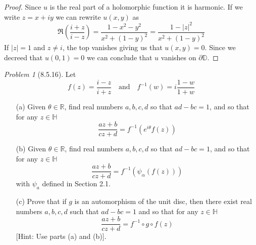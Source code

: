 \documentclass[10pt]{article}
\newcommand{\sk}{\vskip 10mm}
\newcommand{\bb}[1]{\mathbb{#1}}
\theoremstyle{remark}
\newtheorem{problem}{Problem}
\theoremstyle{remark}
\begin{document}
\begin{proof}
  Since $u$ is the real part of a holomorphic function it is harmonic. If
  we write $z=x+iy$ we can rewrite $u(x,y)$ as
  \[
    \Re(\frac{i+z}{i-z})=\frac{1-x^2-y^2}{x^2+(1-y)^2}=\frac{1-|z|^2}{x^2+(1-y)^2}
  \]
  If $|z|=1$ and $z\neq i$, the top vanishes giving us that $u(x,y)=0$.
  Since we decreed that $u(0,1)=0$ we can conclude that $u$ vanishes
  on $\partial\bb{D}$.
\end{proof}

\sk

\begin{problem}[8.5.16]
  Let
  \[
    f(z)=\frac{i-z}{i+z}\quad\text{and}\quad f^{-1}(w)=i\frac{1-w}{1+w}
  \]
  \begin{enumerate}
  \item[(a)] Given $\theta\in\bb{R}$, find real numbers $a,b,c,d$ so that
    $ad-bc=1$, and so that for any $z\in\bb{H}$
    \[
      \frac{az+b}{cz+d}=f^{-1}(e^{i\theta}f(z))
    \]
  \item[(b)] Given $\theta\in\bb{R}$, find real numbers $a,b,c,d$ so that
    $ad-bc=1$, and so that for any $z\in\bb{H}$
    \[
      \frac{az+b}{cz+d}=f^{-1}(\psi_\alpha(f(z)))
    \]
    with $\psi_a$ defined in Section 2.1.
  \item[(c)] Prove that if $g$ is an automorphism of the unit disc, then there
    exist real numbers $a,b,c,d$ such that $ad-bc=1$ and so that for any
    $z\in\bb{H}$
    \[
      \frac{az+b}{cz+d}=f^{-1}\circ g\circ f(z)
    \]
    [Hint: Use parts (a) and (b)].
  \end{enumerate}
\end{problem}
\end{document}

